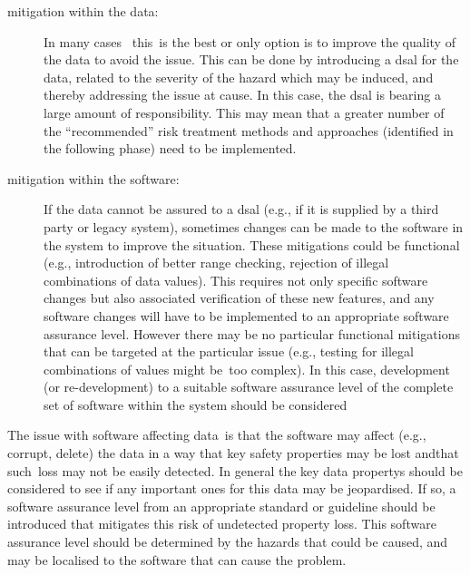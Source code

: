 \begin{description}
  \item[\Gls{mitigation} within the data:] In many cases \cbstart\ this\cbend\ is the best or only option is to improve the quality of the data to avoid the issue. This can be done by introducing a \gls{dsal} for the data, related to the severity of the \gls{hazard} which may be induced, and thereby addressing the issue at cause. In this case, the \gls{dsal} is bearing a large amount of responsibility. This may mean that a greater number of the ``recommended'' risk \gls{treatment} methods and approaches (identified in the following phase) need to be implemented.
  \item[\Gls{mitigation} within the software:] If the data cannot be assured to a \gls{dsal} (e.g., if it is supplied by a third party or legacy system), sometimes changes can be made to the software in the system to improve the situation. These \glspl{mitigation} could be functional (e.g., introduction of better range checking, rejection of illegal combinations of data values). This requires not only specific software changes but also associated \gls{verification} of these new features, and any software changes will have to be implemented to an appropriate \gls{software assurance level}. However there may be no particular functional \cbstart \glspl{mitigation} that can be targeted at the particular issue (e.g., testing for illegal combinations of values might be\cbend\ too complex). \cbstart In this case, development (or re-development) to a suitable \gls{software assurance level} of the complete set of software within the system should be considered\cbend\
\end{description}

\cbstart The issue with software affecting data\cbend\ is that the software may affect (e.g., corrupt, delete) the data in a way that key safety properties may be lost and\cbstart that such\cbend\ loss may not be easily detected. In general the key \glspl{data property} should be considered to see if any important ones for this data may be jeopardised. If so, a \gls{software assurance level} from an appropriate standard or guideline should be introduced that mitigates this risk of undetected property loss. This \gls{software assurance level} should be determined by the hazards that could be caused, and may be localised to the software that can cause the problem.

